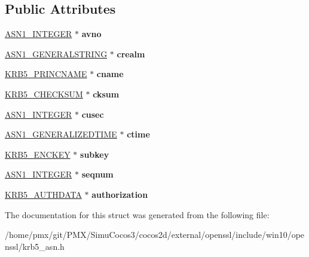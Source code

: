 \subsection*{Public Attributes}
\begin{DoxyCompactItemize}
\item 
\mbox{\label{structkrb5__authenticator__st_a9ed01e68c50931dd9d7ab5bc02c1201d}} 
\hyperlink{structasn1__string__st}{A\+S\+N1\+\_\+\+I\+N\+T\+E\+G\+ER} $\ast$ {\bfseries avno}
\item 
\mbox{\label{structkrb5__authenticator__st_afe6a1007edb042a4152f9f7c81576568}} 
\hyperlink{structasn1__string__st}{A\+S\+N1\+\_\+\+G\+E\+N\+E\+R\+A\+L\+S\+T\+R\+I\+NG} $\ast$ {\bfseries crealm}
\item 
\mbox{\label{structkrb5__authenticator__st_a97834129a3f43febc53ebd5335de32b7}} 
\hyperlink{structkrb5__princname__st}{K\+R\+B5\+\_\+\+P\+R\+I\+N\+C\+N\+A\+ME} $\ast$ {\bfseries cname}
\item 
\mbox{\label{structkrb5__authenticator__st_ac34bce7526107466b7462957744ddee6}} 
\hyperlink{structkrb5__checksum__st}{K\+R\+B5\+\_\+\+C\+H\+E\+C\+K\+S\+UM} $\ast$ {\bfseries cksum}
\item 
\mbox{\label{structkrb5__authenticator__st_a0338e47f6edaf74442f46dc6ad8fbfcb}} 
\hyperlink{structasn1__string__st}{A\+S\+N1\+\_\+\+I\+N\+T\+E\+G\+ER} $\ast$ {\bfseries cusec}
\item 
\mbox{\label{structkrb5__authenticator__st_acdcdd96312d76a5cb2398768e5ed0e69}} 
\hyperlink{structasn1__string__st}{A\+S\+N1\+\_\+\+G\+E\+N\+E\+R\+A\+L\+I\+Z\+E\+D\+T\+I\+ME} $\ast$ {\bfseries ctime}
\item 
\mbox{\label{structkrb5__authenticator__st_a03ed3e43b6e55c3109d5531ee904b8bf}} 
\hyperlink{structkrb5__encryptionkey__st}{K\+R\+B5\+\_\+\+E\+N\+C\+K\+EY} $\ast$ {\bfseries subkey}
\item 
\mbox{\label{structkrb5__authenticator__st_a536a8d151e989aa249609ec5d482ed9c}} 
\hyperlink{structasn1__string__st}{A\+S\+N1\+\_\+\+I\+N\+T\+E\+G\+ER} $\ast$ {\bfseries seqnum}
\item 
\mbox{\label{structkrb5__authenticator__st_afbcfe629c218e03f97fecdfa8f594460}} 
\hyperlink{structkrb5__authorization__st}{K\+R\+B5\+\_\+\+A\+U\+T\+H\+D\+A\+TA} $\ast$ {\bfseries authorization}
\end{DoxyCompactItemize}


The documentation for this struct was generated from the following file\+:\begin{DoxyCompactItemize}
\item 
/home/pmx/git/\+P\+M\+X/\+Simu\+Cocos3/cocos2d/external/openssl/include/win10/openssl/krb5\+\_\+asn.\+h\end{DoxyCompactItemize}
